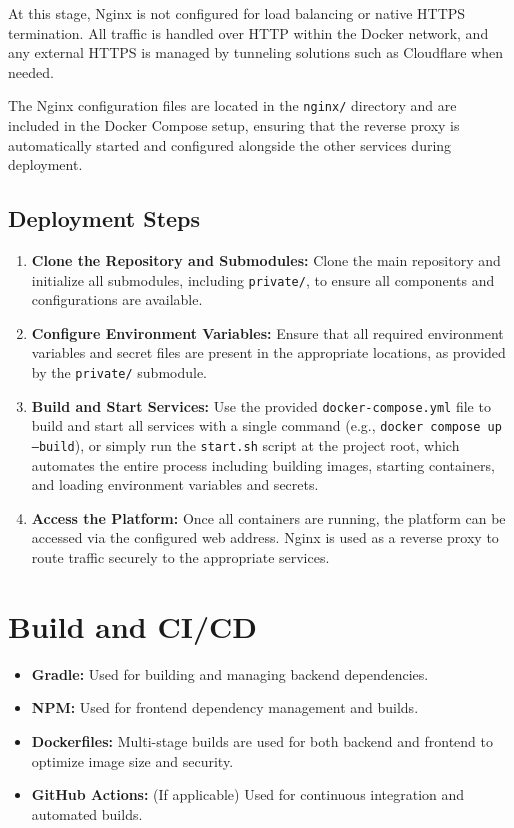 At this stage, Nginx is not configured for load balancing or native HTTPS termination. All traffic is handled over HTTP within the Docker network, and any external HTTPS is managed by tunneling solutions such as Cloudflare when needed.

The Nginx configuration files are located in the \texttt{nginx/} directory and are included in the Docker Compose setup, ensuring that the reverse proxy is automatically started and configured alongside the other services during deployment.

\subsection{Deployment Steps} \label{subsec:deployment_steps}

\begin{enumerate}
    \item \textbf{Clone the Repository and Submodules:} Clone the main repository and initialize all submodules, including \texttt{private/}, to ensure all components and configurations are available.
    \item \textbf{Configure Environment Variables:} Ensure that all required environment variables and secret files are present in the appropriate locations, as provided by the \texttt{private/} submodule.
    \item \textbf{Build and Start Services:} Use the provided \texttt{docker-compose.yml} file to build and start all services with a single command (e.g., \texttt{docker compose up --build}), or simply run the \texttt{start.sh} script at the project root, which automates the entire process including building images, starting containers, and loading environment variables and secrets.
    \item \textbf{Access the Platform:} Once all containers are running, the platform can be accessed via the configured web address. Nginx is used as a reverse proxy to route traffic securely to the appropriate services.
\end{enumerate}

\section{Build and CI/CD} \label{sec:build_cicd}

\begin{itemize}
    \item \textbf{Gradle:} Used for building and managing backend dependencies.
    \item \textbf{NPM:} Used for frontend dependency management and builds.
    \item \textbf{Dockerfiles:} Multi-stage builds are used for both backend and frontend to optimize image size and security.
    \item \textbf{GitHub Actions:} (If applicable) Used for continuous integration and automated builds.
\end{itemize}


